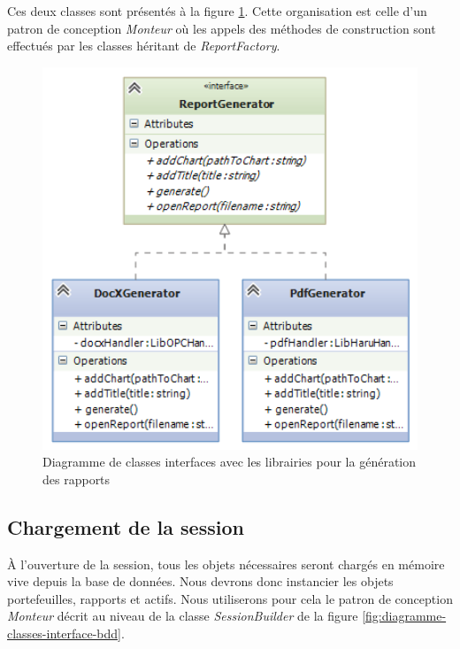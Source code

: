 \documentclass[a4paper]{report}
\begin{document}
Ces deux classes sont présentés à la figure \ref{fig:diagramme-classes-interface-report}.
Cette organisation est celle d'un patron de conception \textit{Monteur} où les appels des méthodes de construction sont effectués par les classes héritant de \textit{ReportFactory}.

\begin{figure}
  	\center
  	\includegraphics[width=1\textwidth]{diagramme-classes-interface-report.png}
  	\caption{Diagramme de classes interfaces avec les librairies pour la génération des rapports}
  	\label{fig:diagramme-classes-interface-report}
\end{figure}





\subsection{Chargement de la session}

\`A l'ouverture de la session, tous les objets nécessaires seront chargés en mémoire vive depuis la base de données.
Nous devrons donc instancier les objets portefeuilles, rapports et actifs.
Nous utiliserons pour cela le patron de conception \textit{Monteur} décrit au niveau de la classe \textit{SessionBuilder} de la figure \ref{fig:diagramme-classes-interface-bdd}.
\end{document}
